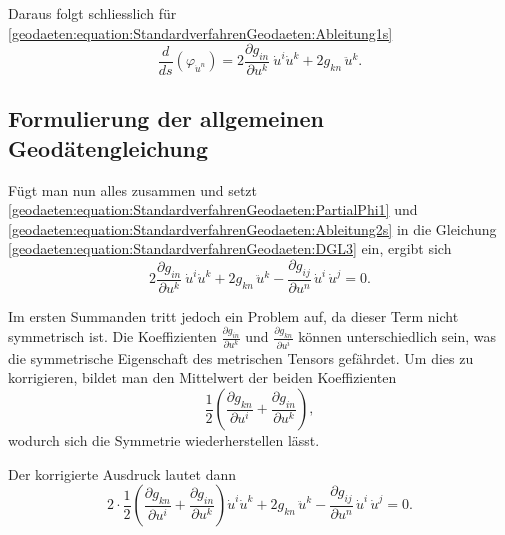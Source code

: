 Daraus folgt schliesslich für \eqref{geodaeten:equation:StandardverfahrenGeodaeten:Ableitung1s}
\begin{equation}
	\frac{d}{ds} \left( \varphi_{\dot{u}^n} \right) = 2 \frac{\partial g_{in}}{\partial u^k} \ \dot{u}^i \dot{u}^k + 2 g_{kn} \, \ddot{u}^k.
	\label{geodaeten:equation:StandardverfahrenGeodaeten:Ableitung2s}
\end{equation}

\subsection{Formulierung der allgemeinen Geodätengleichung}
Fügt man nun alles zusammen und setzt \eqref{geodaeten:equation:StandardverfahrenGeodaeten:PartialPhi1} und \eqref{geodaeten:equation:StandardverfahrenGeodaeten:Ableitung2s} in die Gleichung \eqref{geodaeten:equation:StandardverfahrenGeodaeten:DGL3} ein, ergibt sich
\begin{equation}
	2 \frac{\partial g_{in}}{\partial u^k} \ \dot{u}^i \dot{u}^k + 2 g_{kn} \, \ddot{u}^k - \frac{\partial g_{ij}}{\partial u^n} \, \dot{u}^i \, \dot{u}^j = 0.
\end{equation}

Im ersten Summanden tritt jedoch ein Problem auf, da dieser Term nicht symmetrisch ist. 
Die Koeffizienten $\frac{\partial g_{in}}{\partial u^k}$ und $\frac{\partial g_{kn}}{\partial u^i}$ können unterschiedlich sein, was die symmetrische Eigenschaft des metrischen Tensors gefährdet. 
Um dies zu korrigieren, bildet man den Mittelwert der beiden Koeffizienten
\begin{equation}
	\frac{1}{2} \left( \frac{\partial g_{kn}}{\partial u^i} + \frac{\partial g_{in}}{\partial u^k} \right),
\end{equation}
wodurch sich die Symmetrie wiederherstellen lässt.

Der korrigierte Ausdruck lautet dann
\begin{equation}
	2 \cdot \frac{1}{2} \left( \frac{\partial g_{kn}}{\partial u^i} + \frac{\partial g_{in}}{\partial u^k} \right) \dot{u}^i \dot{u}^k + 2 g_{kn} \, \ddot{u}^k - \frac{\partial g_{ij}}{\partial u^n} \, \dot{u}^i \, \dot{u}^j = 0.
\end{equation}

